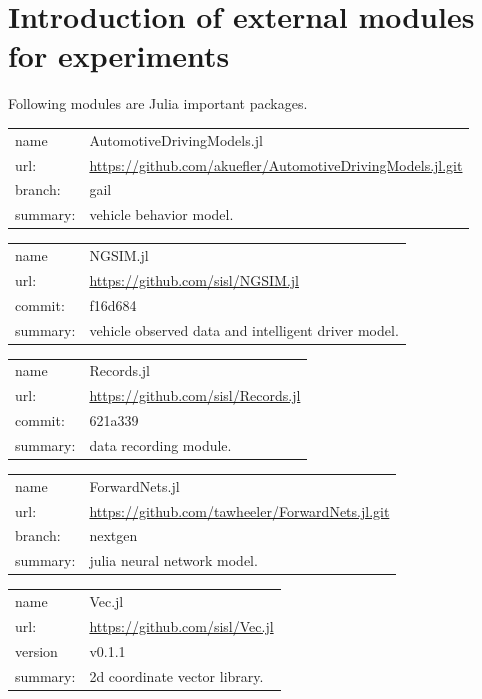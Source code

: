 \documentclass[openany,11pt]{report}%
\begin{document}
\chapter{Introduction of external modules for experiments}


Following modules are Julia important packages.

\begin{tabular}{|p{2cm}p{12cm}|} \hline
name & AutomotiveDrivingModels.jl \\
url: & \url{https://github.com/akuefler/AutomotiveDrivingModels.jl.git} \\ 
branch: & gail \\ 
summary: & vehicle behavior model. \\
\hline
\end{tabular}

\begin{tabular}{|p{2cm}p{12cm}|} \hline
name & NGSIM.jl  \\
url: & \url{https://github.com/sisl/NGSIM.jl} \\
commit: & f16d684 \\
summary: & vehicle observed data and intelligent driver model. \\
\hline
\end{tabular}

\begin{tabular}{|p{2cm}p{12cm}|} \hline
name & Records.jl \\
url: & \url{https://github.com/sisl/Records.jl} \\
commit: & 621a339 \\
summary: & data recording module. \\
\hline
\end{tabular}

\begin{tabular}{|p{2cm}p{12cm}|} \hline
name & ForwardNets.jl \\
url: & \url{https://github.com/tawheeler/ForwardNets.jl.git} \\
branch: & nextgen \\
summary: & julia neural network model. \\
\hline
\end{tabular}

\begin{tabular}{|p{2cm}p{12cm}|} \hline
name & Vec.jl \\
url: & \url{https://github.com/sisl/Vec.jl} \\
version & v0.1.1 \\
summary: & 2d coordinate vector library. \\
\hline
\end{tabular}
\end{document}
